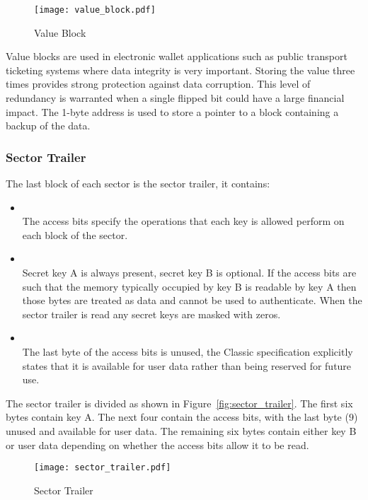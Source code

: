 \documentclass[final,dissertation.tex]{subfiles}
\begin{document}
  \begin{figure}[h]
    \centering
    \texttt{[image: value\_block.pdf]}
    \caption{Value Block}\label{fig:value_block}
  \end{figure}

  Value blocks are used in electronic wallet applications such as public transport ticketing systems where data integrity is very important. Storing the value three times provides strong protection against data corruption. This level of redundancy is warranted when a single flipped bit could have a large financial impact. The 1-byte address is used to store a pointer to a block containing a backup of the data.

  \subsubsection{Sector Trailer}
  The last block of each sector is the sector trailer, it contains:
  \begin{itemize}
    \item {} \\
      The access bits specify the operations that each key is allowed perform on each block of the sector.

    \item {} \\
      Secret key A is always present, secret key B is optional. If the access bits are such that the memory typically occupied by key B is readable by key A then those bytes are treated as data and cannot be used to authenticate. When the sector trailer is read any secret keys are masked with zeros.

    \item {} \\
      The last byte of the access bits is unused, the \mifare{} Classic specification explicitly states that it is available for user data rather than being reserved for future use\cite{semiconductors2002mifare}.
  \end{itemize}

  The sector trailer is divided as shown in Figure~\vref{fig:sector_trailer}. The first six bytes contain key A. The next four contain the access bits, with the last byte ($9$) unused and available for user data. The remaining six bytes contain either key B or user data depending on whether the access bits allow it to be read.

  \begin{figure}[h]
    \centering
    \texttt{[image: sector\_trailer.pdf]}
    \caption{Sector Trailer}\label{fig:sector_trailer}
  \end{figure}
\end{document}

